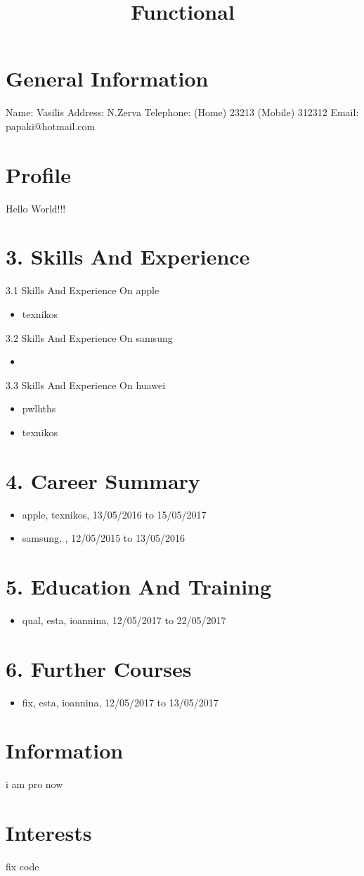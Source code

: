 \documentclass{article}
\title{Functional}
\begin{document}
 
 \section{ General Information} 
 {Name: Vasilis} \newline 
 {Address: N.Zerva} \newline 
 {Telephone: (Home) 23213}  	{(Mobile) 312312} \newline 
 {Email: papaki@hotmail.com}
 \section{Profile} 
 {Hello World!!!}
 \section{3. Skills And Experience} 
{3.1 Skills And Experience On apple}
\begin{itemize} 
\item {texnikos}
\end{itemize} 
{3.2 Skills And Experience On samsung}
\begin{itemize} 
\item {}\end{itemize} 
{3.3 Skills And Experience On huawei}
\begin{itemize} 
\item {pwlhths}
\item {texnikos}
\end{itemize} 
 \section{4. Career Summary} 
\begin{itemize} 
\item {apple, texnikos, 13/05/2016 to 15/05/2017}
\item {samsung, , 12/05/2015 to 13/05/2016}
\end{itemize} 
 \section{5. Education And Training} 
\begin{itemize} 
\item {qual, esta, ioannina, 12/05/2017 to 22/05/2017}
\end{itemize} 
 \section{6. Further Courses} 
\begin{itemize} 
\item {fix, esta, ioannina, 12/05/2017 to 13/05/2017}
\end{itemize} 
 \section{Information} 
 {i am pro now}
 \section{Interests} 
 {fix code}
\end{document}
